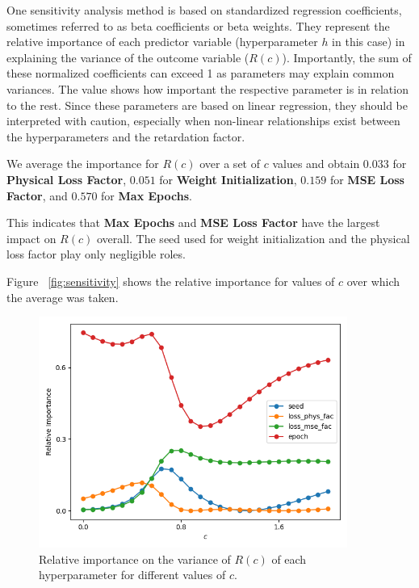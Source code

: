 One sensitivity analysis method is based on standardized regression coefficients, sometimes referred to as beta coefficients or beta weights. They represent the relative importance of each predictor variable (hyperparameter $h$ in this case) in explaining the variance of the outcome variable ($R(c)$).
Importantly, the sum of these normalized coefficients can exceed 1 as parameters may explain common variances. The value shows how important the respective parameter is in relation to the rest.
Since these parameters are based on linear regression, they should be interpreted with caution, especially when non-linear relationships exist between the hyperparameters and the retardation factor.

We average the importance for $R(c)$ over a set of $c$ values and obtain $0.033$ for \textbf{Physical Loss Factor}, $0.051$ for \textbf{Weight Initialization}, $0.159$ for \textbf{MSE Loss Factor}, and $0.570$ for \textbf{Max Epochs}.

This indicates that \textbf{Max Epochs} and \textbf{MSE Loss Factor} have the largest impact on $R(c)$ overall. The seed used for weight initialization and the physical loss factor play only negligible roles.

Figure ~\vref{fig:sensitivity} shows the relative importance for values of $c$ over which the average was taken.


\begin{figure}
    \centering
    \includegraphics[width=0.9\textwidth]{figs/sensitivity.png}
    \caption{Relative importance on the variance of $R(c)$ of each hyperparameter for different values of $c$.}
    \label{fig:sensitivity}
\end{figure}



